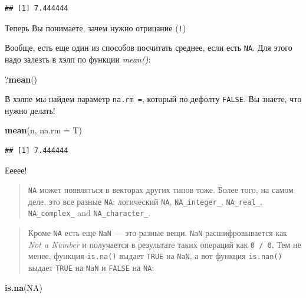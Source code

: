 \documentclass[]{book}
\newenvironment{Shaded}{\begin{snugshade}}{\end{snugshade}}
\newcommand{\KeywordTok}[1]{\textcolor[rgb]{0.13,0.29,0.53}{\textbf{#1}}}
\newcommand{\DataTypeTok}[1]{\textcolor[rgb]{0.13,0.29,0.53}{#1}}
\newcommand{\OtherTok}[1]{\textcolor[rgb]{0.56,0.35,0.01}{#1}}
\newcommand{\NormalTok}[1]{#1}
\begin{document}
\begin{verbatim}
## [1] 7.444444
\end{verbatim}

Теперь Вы понимаете, зачем нужно отрицание (\texttt{!})

Вообще, есть еще один из способов посчитать среднее, если есть
\texttt{NA}. Для этого надо залезть в хэлп по функции \emph{mean()}:

\begin{Shaded}
\begin{Highlighting}[]
\NormalTok{?}\KeywordTok{mean}\NormalTok{()}
\end{Highlighting}
\end{Shaded}

В хэлпе мы найдем параметр \texttt{na.rm\ =}, который по дефолту
\texttt{FALSE}. Вы знаете, что нужно делать!

\begin{Shaded}
\begin{Highlighting}[]
\KeywordTok{mean}\NormalTok{(n, }\DataTypeTok{na.rm =}\NormalTok{ T)}
\end{Highlighting}
\end{Shaded}

\begin{verbatim}
## [1] 7.444444
\end{verbatim}

Еееее!

\begin{quote}
\texttt{NA} может появляться в векторах других типов тоже. Более того,
на самом деле, это все разные \texttt{NA}: логический \texttt{NA},
\texttt{NA\_integer\_}, \texttt{NA\_real\_}, \texttt{NA\_complex\_} and
\texttt{NA\_character\_}.
\end{quote}

\begin{quote}
Кроме \texttt{NA} есть еще \texttt{NaN} --- это разные вещи.
\texttt{NaN} расшифровывается как \emph{Not a Number} и получается в
результате таких операций как \texttt{0\ /\ 0}. Тем не менее, функция
\texttt{is.na()} выдает \texttt{TRUE} на \texttt{NaN}, а вот функция
\texttt{is.nan()} выдает \texttt{TRUE} на \texttt{NaN} и \texttt{FALSE}
на \texttt{NA}:
\end{quote}

\begin{Shaded}
\begin{Highlighting}[]
\KeywordTok{is.na}\NormalTok{(}\OtherTok{NA}\NormalTok{)}
\end{Highlighting}
\end{Shaded}
\end{document}
